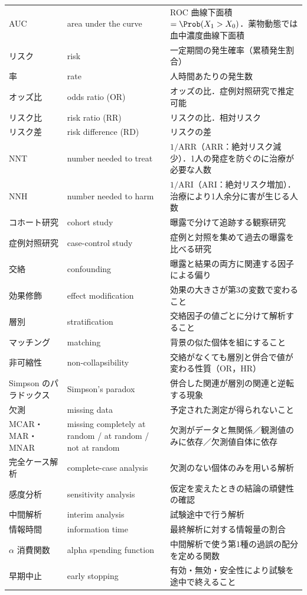 \begin{center}
\begin{longtable}{@{}L{32mm}L{40mm}L{78mm}@{}}
AUC & area under the curve & ROC 曲線下面積 $=\Prob(X_1>X_0)$．薬物動態では血中濃度曲線下面積\\
リスク & risk & 一定期間の発生確率（累積発生割合）\\
率 & rate & 人時間あたりの発生数\\
オッズ比 & odds ratio (OR) & オッズの比．症例対照研究で推定可能\\
リスク比 & risk ratio (RR) & リスクの比．相対リスク\\
リスク差 & risk difference (RD) & リスクの差\\
NNT & number needed to treat & $1/\mathrm{ARR}$（ARR：絶対リスク減少）．1人の発症を防ぐのに治療が必要な人数\\
NNH & number needed to harm & $1/\mathrm{ARI}$（ARI：絶対リスク増加）．治療により1人余分に害が生じる人数\\
コホート研究 & cohort study & 曝露で分けて追跡する観察研究\\
症例対照研究 & case-control study & 症例と対照を集めて過去の曝露を比べる研究\\
交絡 & confounding & 曝露と結果の両方に関連する因子による偏り\\
効果修飾 & effect modification & 効果の大きさが第3の変数で変わること\\
層別 & stratification & 交絡因子の値ごとに分けて解析すること\\
マッチング & matching & 背景の似た個体を組にすること\\
非可縮性 & non-collapsibility & 交絡がなくても層別と併合で値が変わる性質（OR，HR）\\
Simpson のパラドックス & Simpson's paradox & 併合した関連が層別の関連と逆転する現象\\
欠測 & missing data & 予定された測定が得られないこと\\
MCAR・MAR・MNAR & missing completely at random / at random / not at random & 欠測がデータと無関係／観測値のみに依存／欠測値自体に依存\\
完全ケース解析 & complete-case analysis & 欠測のない個体のみを用いる解析\\
感度分析 & sensitivity analysis & 仮定を変えたときの結論の頑健性の確認\\
中間解析 & interim analysis & 試験途中で行う解析\\
情報時間 & information time & 最終解析に対する情報量の割合\\
$\alpha$ 消費関数 & alpha spending function & 中間解析で使う第1種の過誤の配分を定める関数\\
早期中止 & early stopping & 有効・無効・安全性により試験を途中で終えること\\

\end{longtable}
\end{center}
